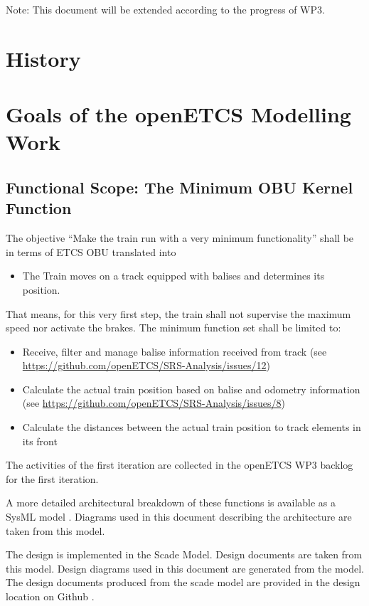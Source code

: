 \documentclass{template/openetcs_report}
\begin{document}
Note: This document will be extended according to the progress of WP3. 


\section{History}

\section{Goals of the openETCS Modelling Work}


\subsection{Functional Scope: The Minimum OBU Kernel Function}
\label{sec:FunctionalScopeTheMinimumOBUKernelFunction}

The objective ``Make the train run with a very minimum functionality'' shall be in terms of ETCS OBU translated into 
\begin{itemize}
	\item The Train moves on a track equipped with balises and determines its position.
\end{itemize}
That means, for this very first step, the train shall not supervise the maximum speed nor activate the brakes. The minimum function set shall be limited to:
\begin{itemize}
	\item Receive, filter and manage balise information received from track (see \url{https://github.com/openETCS/SRS-Analysis/issues/12})
	\item Calculate the actual train position based on balise and odometry information (see \url{https://github.com/openETCS/SRS-Analysis/issues/8})
	\item Calculate the distances between the actual train position to track elements in its front
\end{itemize}
The activities of the first iteration are collected in the \cite{firstIteration} openETCS WP3 backlog for the first iteration.

A more detailed architectural breakdown of these functions is available as a SysML model \cite{sysml-model}. Diagrams used in this document describing the architecture are taken from this model.

The design is implemented in the \cite{scade-model} Scade Model. Design documents are taken from this model. Design diagrams used in this document are generated from the model. The design documents produced from the scade model are provided in the design location on Github \cite{designFI}.
\end{document}
